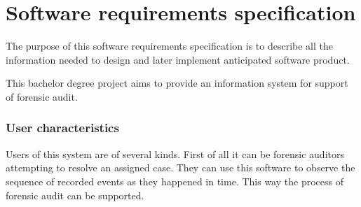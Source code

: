 \chapter{Software requirements specification}\label{SRS}


The purpose of this software requirements specification is to describe all the information needed to design and later implement anticipated software product. 

This bachelor degree project aims to provide an information system for support of forensic audit.  




\subsection{User characteristics}
Users of this system are of several kinds. First of all it can be forensic auditors attempting to resolve an assigned case. They can use this software to observe the sequence of recorded events as they happened in time. This way the process of forensic audit can be supported. 







